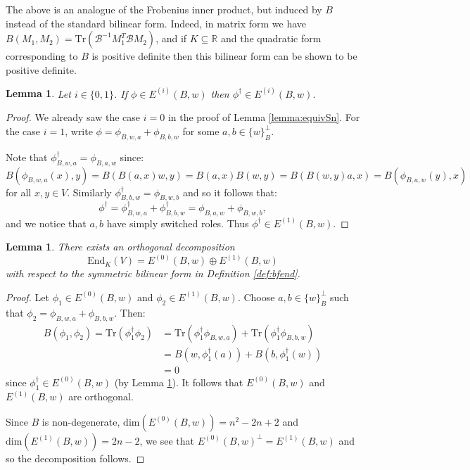 \documentclass{amsart}
\theoremstyle{plain}
\newtheorem{lemma}[theorem]{Lemma}
\theoremstyle{definition}
\begin{document}
The above is an analogue of the Frobenius inner product, but induced by $B$ instead of the standard bilinear form. Indeed, in matrix form we have $B(M_1, M_2) = \text{Tr}(\mathcal{B}^{-1}M_1^T\mathcal{B}M_2)$, and if $K\subseteq\mathbb{R}$ and the quadratic form corresponding to $B$ is positive definite then this bilinear form can be shown to be positive definite.

\begin{lemma}
\label{lemma:rewriteSV}
Let $i\in\{0,1\}$. If $\phi\in E^{(i)}(B,w)$ then $\phi^\dagger \in E^{(i)}(B,w)$. 
\end{lemma}

\begin{proof}
We already saw the case $i=0$ in the proof of Lemma \ref{lemma:equivSn}. For the case $i=1$, write $\phi = \phi_{B,w,a}+\phi_{B,b,w}$ for some $a,b\in\{w\}_B^{\perp}$. 

Note that $\phi_{B,w,a}^{\dagger} = \phi_{B,a,w}$ since: \[B(\phi_{B,w,a}(x),y) = B(B(a,x)w,y) = B(a,x)B(w,y) = B(B(w,y)a,x) = B(\phi_{B,a,w}(y),x)\] for all $x,y\in V$. Similarly $\phi_{B,b,w}^{\dagger} = \phi_{B,w,b}$ and so it follows that: \[\phi^\dagger = \phi_{B,w,a}^\dagger+\phi_{B,b,w}^\dagger = \phi_{B,a,w}+\phi_{B,w,b},\] and we notice that $a,b$ have simply switched roles. Thus $\phi^\dagger\in E^{(1)}(B,w)$.
\end{proof}

\begin{lemma}
\label{lem:decomp}
There exists an orthogonal decomposition \[\text{End}_K(V) = E^{(0)}(B,w)\oplus E^{(1)}(B,w)\] with respect to the symmetric bilinear form in Definition \ref{def:bfend}.
\end{lemma}

\begin{proof}
Let $\phi_1 \in E^{(0)}(B,w)$ and $\phi_2 \in E^{(1)}(B,w)$. Choose $a,b\in\{w\}_B^{\perp}$ such that $\phi_2 = \phi_{B,w,a}+\phi_{B,b,w}$. Then:
\begin{align*}
    B(\phi_1, \phi_2) = \text{Tr}(\phi_1^\dagger\phi_2)&= \text{Tr}(\phi_1^\dagger \phi_{B,w,a}) + \text{Tr}(\phi_1^\dagger \phi_{B,b,w}) \\
    &= B(w,\phi_1^\dagger(a)) + B(b,\phi_1^\dagger(w))\\
    &= 0
\end{align*}
since $\phi_1^\dagger\in E^{(0)}(B,w)$ (by Lemma \ref{lemma:rewriteSV}). It follows that $E^{(0)}(B,w)$ and $E^{(1)}(B,w)$ are orthogonal. 

Since $B$ is non-degenerate, $\text{dim}(E^{(0)}(B,w)) = n^2-2n+2$ and $\text{dim}(E^{(1)}(B,w)) = 2n-2$, we see that $E^{(0)}(B,w)^{\perp} = E^{(1)}(B,w)$ and so the decomposition follows.
\end{proof}
\end{document}
